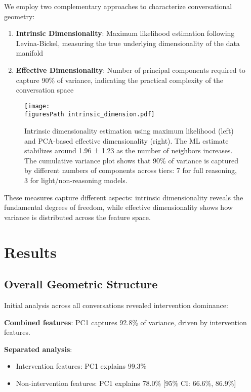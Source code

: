 \documentclass[11pt,letterpaper]{article}
\newcommand{\allFeaturesPCOne}{92.8\%}
\newcommand{\interventionPCOneVariance}{99.3\%}
\newcommand{\nonInterventionPCOneVariance}{78.0\%}
\newcommand{\nonInterventionPCOneCILower}{66.6\%}
\newcommand{\nonInterventionPCOneCIUpper}{86.9\%}
\newcommand{\fullReasoningPCANinety}{7}
\newcommand{\lightReasoningPCANinety}{3}
\newcommand{\overallIntrinsicDim}{1.96}
\newcommand{\overallIntrinsicDimStd}{1.23}
\newcommand{\figuresPath}{../analysis/analysis_outputs/figures/}
\begin{document}
We employ two complementary approaches to characterize conversational geometry:

\begin{enumerate}
    \item \textbf{Intrinsic Dimensionality}: Maximum likelihood estimation following Levina-Bickel, measuring the true underlying dimensionality of the data manifold
    \item \textbf{Effective Dimensionality}: Number of principal components required to capture 90\% of variance, indicating the practical complexity of the conversation space
\end{enumerate}

\begin{figure}[htbp]
\centering
\texttt{[image: \\figuresPath intrinsic\_dimension.pdf]}
\caption{Intrinsic dimensionality estimation using maximum likelihood (left) and PCA-based effective dimensionality (right). The ML estimate stabilizes around \overallIntrinsicDim{} ± \overallIntrinsicDimStd{} as the number of neighbors increases. The cumulative variance plot shows that 90\% of variance is captured by different numbers of components across tiers: \fullReasoningPCANinety{} for full reasoning, \lightReasoningPCANinety{} for light/non-reasoning models.}
\label{fig:intrinsic_dimension}
\end{figure}

These measures capture different aspects: intrinsic dimensionality reveals the fundamental degrees of freedom, while effective dimensionality shows how variance is distributed across the feature space.



\section{Results}

\subsection{Overall Geometric Structure}

Initial analysis across all conversations revealed intervention dominance:

\textbf{Combined features}: PC1 captures \allFeaturesPCOne{} of variance, driven by intervention features.

\textbf{Separated analysis}:
\begin{itemize}
    \item Intervention features: PC1 explains \interventionPCOneVariance{}
    \item Non-intervention features: PC1 explains \nonInterventionPCOneVariance{} [95\% CI: \nonInterventionPCOneCILower{}, \nonInterventionPCOneCIUpper{}]
\end{itemize}
\end{document}
